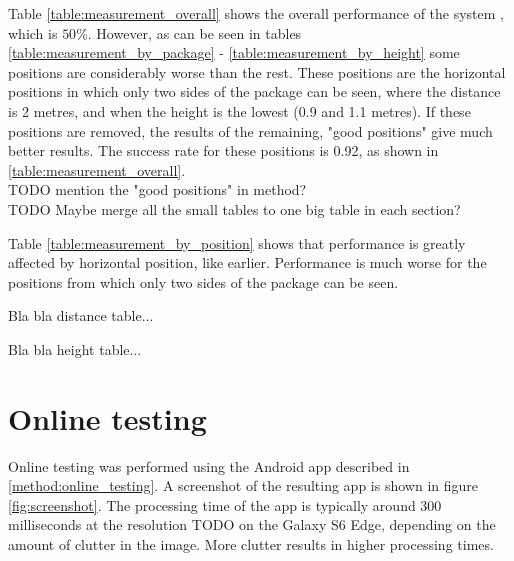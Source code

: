 Table \ref{table:measurement_overall} shows the overall performance of the system , which is $50\%$. However, as can be seen in tables \ref{table:measurement_by_package} - \ref{table:measurement_by_height} some positions are considerably worse than the rest.
These positions are the horizontal positions in which only two sides of the package can be seen, where the distance is 2 metres, and when the height is the lowest (0.9 and 1.1 metres).
If these positions are removed, the results of the remaining, "good positions" give much better results. The success rate for these positions is 0.92, as shown in \ref{table:measurement_overall}.
\\TODO mention the "good positions" in method? %
\\TODO Maybe merge all the small tables to one big table in each section? %





Table \ref{table:measurement_by_position} shows that performance is greatly affected by horizontal position, like earlier. Performance is much worse for the positions from which only two sides of the package can be seen. 



Bla bla distance table... %



Bla bla height table... %



\section{Online testing}

Online testing was performed using the Android app described in \ref{method:online_testing}.
A screenshot of the resulting app is shown in figure \ref{fig:screenshot}.
The processing time of the app is typically around 300 milliseconds at the resolution  TODO on the Galaxy S6 Edge, depending on the amount of clutter in the image. %
More clutter results in higher processing times.

